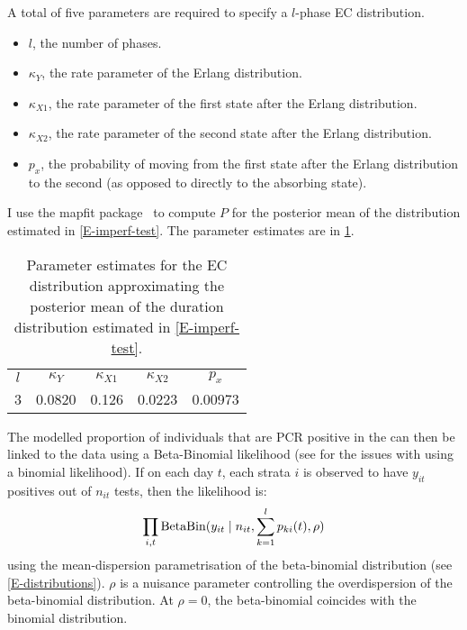 \documentclass[thesis.tex]{subfiles}
\begin{document}
A total of five parameters are required to specify a $l$-phase EC distribution.
\begin{itemize}
    \item $l$, the number of phases.
    \item $\kappa_Y$, the rate parameter of the Erlang distribution.
    \item $\kappa_{X1}$, the rate parameter of the first state after the Erlang distribution.
    \item $\kappa_{X2}$, the rate parameter of the second state after the Erlang distribution.
    \item $p_x$, the probability of moving from the first state after the Erlang distribution to the second (as opposed to directly to the absorbing state).
\end{itemize}

I use the mapfit package~\autocite{mapfit} to compute $P$ for the posterior mean of the distribution estimated in \cref{E-imperf-test}.
The parameter estimates are in \cref{SEIR:table:ec-params}.
\begin{table}
    \centering
    \begin{tabular}{c c c c c}
        $l$ & $\kappa_Y$ & $\kappa_{X1}$ & $\kappa_{X2}$ & $p_x$ \\
        3 & 0.0820 & 0.126 & 0.0223 & 0.00973  \\
    \end{tabular}
    \caption{Parameter estimates for the EC distribution approximating the posterior mean of the duration distribution estimated in \cref{E-imperf-test}.}
    \label{SEIR:table:ec-params}
\end{table}

The modelled proportion of individuals that are PCR positive in the can then be linked to the data using a Beta-Binomial likelihood (see for the issues with using a binomial likelihood).
If on each day $t$, each strata $i$ is observed to have $y_{it}$ positives out of $n_{it}$ tests, then the likelihood is:
\begin{align}
    \prod_{i,t} \operatorname{BetaBin} (y_{it} \mid n_{it}, \sum_{k=1}^l p_{ki}(t), \rho)
\end{align}
using the mean-dispersion parametrisation of the beta-binomial distribution (see \cref{E-distributions}).
$\rho$ is a nuisance parameter controlling the overdispersion of the beta-binomial distribution.
At $\rho=0$, the beta-binomial coincides with the binomial distribution.
\end{document}
